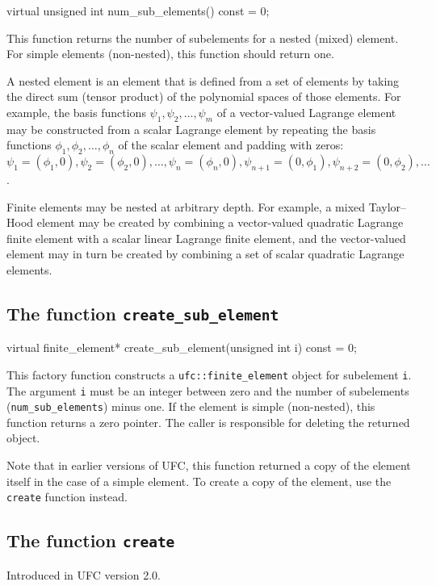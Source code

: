 \begin{code}
virtual unsigned int num_sub_elements() const = 0;
\end{code}

This function returns the number of subelements for a nested (mixed)
element. For simple elements (non-nested), this function should return
one.

A nested element is an element that is defined from a set of elements
by taking the direct sum (tensor product) of the polynomial spaces of
those elements. For example, the basis functions $\psi_1, \psi_2,
\ldots, \psi_m$ of a vector-valued Lagrange element may be constructed
from a scalar Lagrange element by repeating the basis functions
$\phi_1, \phi_2, \ldots, \phi_n$ of the scalar element and padding
with zeros: $\psi_1 = (\phi_1, 0), \psi_2 = (\phi_2, 0), \ldots,
\psi_n = (\phi_n, 0), \psi_{n+1} = (0, \phi_1), \psi_{n+2} = (0,
\phi_2), \ldots$.

Finite elements may be nested at arbitrary depth. For example, a mixed
Taylor--Hood element may be created by combining a vector-valued
quadratic Lagrange finite element with a scalar linear Lagrange finite
element, and the vector-valued element may in turn be created by
combining a set of scalar quadratic Lagrange elements.

\subsection{The function \texttt{create\_sub\_element}}

\begin{code}
virtual finite_element*
create_sub_element(unsigned int i) const = 0;
\end{code}

This factory function constructs a \texttt{ufc::finite\_element}
object for subelement \texttt{i}. The argument \texttt{i} must be an
integer between zero and the number of subelements
(\texttt{num\_sub\_elements}) minus one. If the element is simple
(non-nested), this function returns a zero pointer. The caller is
responsible for deleting the returned object.

Note that in earlier versions of UFC, this function returned a copy of
the element itself in the case of a simple element. To create a copy
of the element, use the \texttt{create} function instead.

\subsection{The function \texttt{create}}
Introduced in UFC version 2.0.

